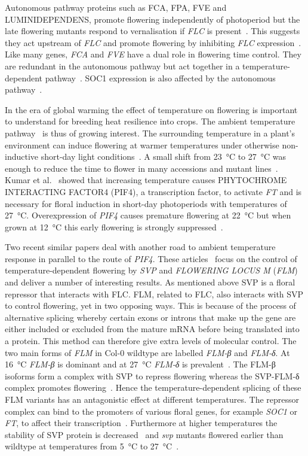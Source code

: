 Autonomous pathway proteins such as FCA, FPA, FVE and LUMINIDEPENDENS, promote flowering independently of photoperiod but the late flowering mutants respond to vernalisation if \emph{FLC} is present~\cite{michaels2001}.
This suggests they act upstream of \emph{FLC} and promote flowering by inhibiting \emph{FLC} expression~\cite{michaels2001}.
Like many genes, \emph{FCA} and \emph{FVE} have a dual role in flowering time control.
They are redundant in the autonomous pathway but act together in a temperature-dependent pathway~\cite{blazquez2003}.
SOC1 expression is also affected by the autonomous pathway~\cite{borner2000,samach2000}.

In the era of global warming the effect of temperature on flowering is important to understand for breeding heat resilience into crops.
The ambient temperature pathway~\cite{blazquez2003,balasubramanian2006} is thus of growing interest.
The surrounding temperature in a plant's environment can induce flowering at warmer temperatures under otherwise non-inductive short-day light conditions~\cite{balasubramanian2006}.
A small shift from 23~°C to 27~°C was enough to reduce the time to flower in many accessions and mutant lines~\cite{balasubramanian2006}.
Kumar et al.~\cite{kumar2012} showed that increasing temperature causes PHYTOCHROME INTERACTING FACTOR4 (PIF4), a transcription factor, to activate \emph{FT} and is necessary for floral induction in short-day photoperiods with temperatures of 27~°C.
Overexpression of \emph{PIF4} causes premature flowering at 22~°C but when grown at 12~°C this early flowering is strongly suppressed~\cite{kumar2012}.

Two recent similar papers deal with another road to ambient temperature response in parallel to the route of \emph{PIF4}.
These articles~\cite{pose2013,lee2013} focus on the control of temperature-dependent flowering by \emph{SVP} and \emph{FLOWERING LOCUS M} (\emph{FLM}) and deliver a number of interesting results.
As mentioned above SVP is a floral repressor that interacts with FLC.
FLM, related to FLC, also interacts with SVP to control flowering, yet in two opposing ways.
This is because of the process of alternative splicing whereby certain exons or introns that make up the gene are either included or excluded from the mature mRNA before being translated into a protein.
This method can therefore give extra levels of molecular control.
The two main forms of \emph{FLM} in Col-0 wildtype are labelled \emph{FLM-β} and \emph{FLM-δ}.
At 16~°C \emph{FLM-β} is dominant and at 27~°C \emph{FLM-δ} is prevalent~\cite{pose2013}.
The FLM-β isoforms form a complex with SVP to repress flowering whereas the SVP-FLM-δ complex promotes flowering~\cite{pose2013,lee2013}.
Hence the temperature-dependent splicing of these FLM variants has an antagonistic effect at different temperatures.
The repressor complex can bind to the promoters of various floral genes, for example \emph{SOC1} or \emph{FT}, to affect their transcription~\cite{pose2013,lee2013}.
Furthermore at higher temperatures the stability of SVP protein is decreased~\cite{lee2013} and \emph{svp} mutants flowered earlier than wildtype at temperatures from 5~°C to 27~°C~\cite{lee2013}.

